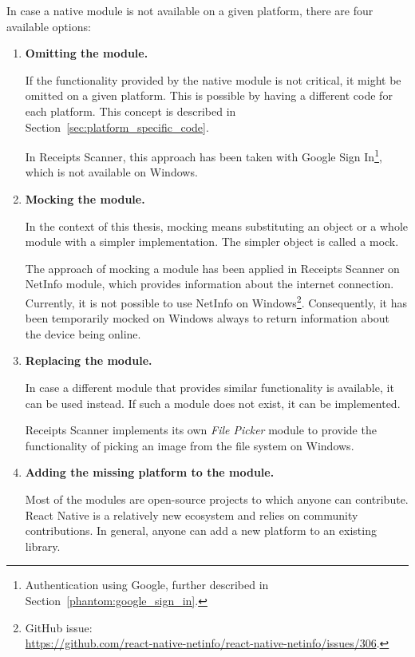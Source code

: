 \documentclass[
  digital, %
  table,   %
  oneside, %
  lof,     %
  lot,     %
]{fithesis3}
\begin{document}
\newpage
In case a native module is not available on a given platform, there are four available options:
\begin{enumerate}
    \item \textbf{Omitting the module.} 
    
    If the functionality provided by the native module is not critical, it might be omitted on a given platform. This is possible by having a different code for each platform. This concept is described in Section~\ref{sec:platform_specific_code}.
    
    In Receipts Scanner, this approach has been taken with Google Sign In\footnote{Authentication using Google, further described in Section~\ref{phantom:google_sign_in}.}, which is not available on Windows.
    
    \item \textbf{Mocking the module.}
    
    In the context of this thesis, mocking means substituting an object or a whole module with a simpler implementation. The simpler object is called a mock.
    
    The approach of mocking a module has been applied in Receipts Scanner on NetInfo module, which provides information about the internet connection. Currently, it is not possible to use NetInfo on Windows\footnote{GitHub issue:\\\url{https://github.com/react-native-netinfo/react-native-netinfo/issues/306}.}. Consequently, it has been temporarily mocked on Windows always to return information about the device being online.
    
    \item \textbf{Replacing the module.} 
    
    In case a different module that provides similar functionality is available, it can be used instead. If such a module does not exist, it can be implemented.
    
    Receipts Scanner implements its own \textit{File Picker} module to provide the functionality of picking an image from the file system on Windows.
    
    \item \textbf{Adding the missing platform to the module.}
    
    Most of the modules are open-source projects to which anyone can contribute. React Native is a relatively new ecosystem and relies on community contributions. In general, anyone can add a new platform to an existing library.
\end{enumerate}
\end{document}
